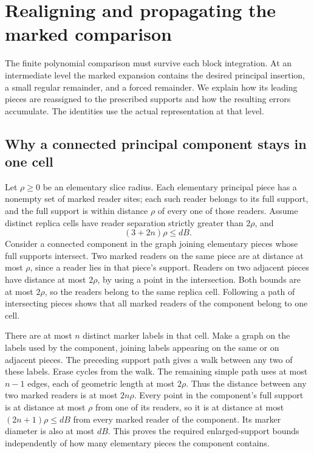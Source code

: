 \section{Realigning and propagating the marked comparison}
\label{sec:allarity-marked-propagation}

The finite polynomial comparison must survive each block integration.
At an intermediate level the marked expansion contains the desired
principal insertion, a small regular remainder, and a forced remainder.
We explain how its leading pieces are reassigned to the prescribed
supports and how the resulting errors accumulate. The identities use
the actual representation at that level.

\subsection{Why a connected principal component stays in one cell}

Let $\rho\ge0$ be an elementary slice radius. Each elementary principal
piece has a nonempty set of marked reader sites; each such reader belongs
to its full support, and the full support is within distance $\rho$ of
every one of those readers. Assume distinct
replica cells have reader separation strictly greater than $2\rho$, and
\[
                  (3+2n)\rho\le dB.
\]
Consider a connected component in the graph joining elementary pieces
whose full supports intersect. Two marked readers on the same piece
are at distance at most $\rho$, since a reader lies in that piece's
support. Readers on two adjacent pieces have distance at most
$2\rho$, by using a point in the intersection. Both bounds are at most
$2\rho$, so the readers belong to the same replica cell. Following a
path of intersecting pieces shows that all marked readers of the
component belong to one cell.

There are at most $n$ distinct marker labels in that cell. Make a graph
on the labels used by the component, joining labels appearing on the
same or on adjacent pieces. The preceding support path gives a walk
between any two of these labels. Erase cycles from the walk. The
remaining simple path uses at most $n-1$ edges, each of geometric
length at most $2\rho$. Thus the distance between any two marked
readers is at most $2n\rho$. Every point in the component's full
support is at distance at most $\rho$ from one of its readers, so
it is at distance at most $(2n+1)\rho\le dB$ from every marked
reader of the component. Its marker diameter is also at most $dB$.
This proves the required enlarged-support bounds independently of
how many elementary pieces the component contains.

